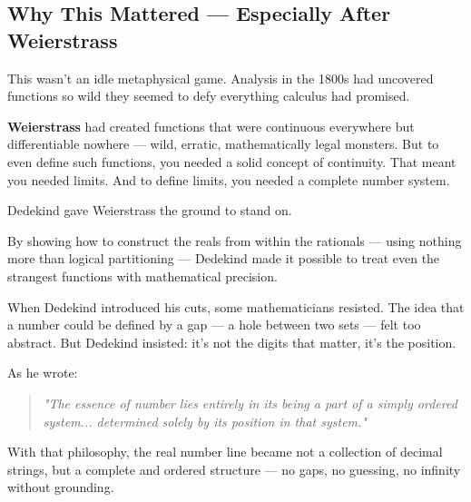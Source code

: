 \subsection{Why This Mattered — Especially After Weierstrass}

This wasn’t an idle metaphysical game. Analysis in the 1800s had uncovered functions so wild they seemed to defy everything calculus had promised.

\textbf{Weierstrass} had created functions that were continuous everywhere but differentiable nowhere — wild, erratic, mathematically legal monsters. But to even define such functions, you needed a solid concept of continuity. That meant you needed limits. And to define limits, you needed a complete number system.

Dedekind gave Weierstrass the ground to stand on.

By showing how to construct the reals from within the rationals — using nothing more than logical partitioning — Dedekind made it possible to treat even the strangest functions with mathematical precision.

\begin{tcolorbox}[colback=gray!5!white, colframe=black!80!white, title={Historical Sidenote: Filling the Gaps with Logic}]
When Dedekind introduced his cuts, some mathematicians resisted. The idea that a number could be defined by a gap — a hole between two sets — felt too abstract. But Dedekind insisted: it’s not the digits that matter, it’s the position.

As he wrote:
\begin{quote}
\textit{"The essence of number lies entirely in its being a part of a simply ordered system... determined solely by its position in that system."}
\end{quote}

With that philosophy, the real number line became not a collection of decimal strings, but a complete and ordered structure — no gaps, no guessing, no infinity without grounding.
\end{tcolorbox}
